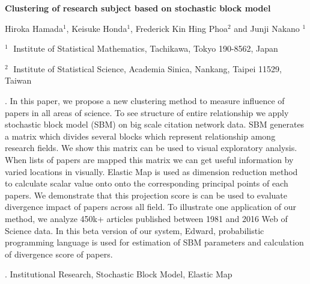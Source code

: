 \documentclass[12pt]{article}
\begin{document}
\begin{flushleft}


{\LARGE\bf Clustering of research subject based on stochastic block model}


\vspace{1.0cm}

Hiroka Hamada$^1$, Keisuke Honda$^1$, Frederick Kin Hing Phoa$^2$ and Junji Nakano $^1$

\begin{description}

\item $^1 \;$ Institute of Statistical Mathematics,
Tachikawa, Tokyo 190-8562, Japan

\item $^2 \;$ Institute of Statistical Science, Academia Sinica,
Nankang, Taipei 11529, Taiwan

\end{description}

\end{flushleft}


\vspace{0.75cm}

. In this paper, we propose a new clustering method to measure influence of papers in all areas of science. To see structure of entire relationship we apply stochastic block model (SBM) on big scale citation network data. SBM generates a matrix which divides several blocks which represent relationship among research fields. We show this matrix can be used to visual exploratory analysis. When lists of papers are mapped this matrix we can get useful information by varied locations in visually. Elastic Map is used as dimension reduction method to calculate scalar value onto onto the corresponding principal points of each papers. We demonstrate that this projection score is can be used to evaluate divergence impact of papers across all field. To illustrate one application of our method, we analyze 450k+ articles published between 1981 and 2016 Web of Science data. In this beta version of our system, Edward, probabilistic programming language is used for estimation of SBM parameters and calculation of divergence score of papers.

\vskip 2mm

.
Institutional Research, Stochastic Block Model, Elastic Map
\end{document}

